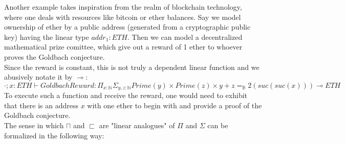 Another example takes inspiration from the realm of blockchain technology, where one deals with resources like bitcoin or ether balances. Say we model ownership of ether by a public address (generated from a cryptographic public key) having the linear type $addr_1 : ETH$. Then we can model a decentralized  mathematical prize comittee, which give out a reward of 1 ether to whoever proves the Goldbach conjecture.\\
Since the reward is constant, this is not truly a dependent linear function and we abusively notate it by $\multimap$:
\[
\cdot; x : ETH \vdash GoldbachReward: \Pi_{x : \mathbb{N}}\Sigma_{y, z : \mathbb{N}}Prime(y) \times Prime(z) \times y + z =_{\mathbb{B}} 2(suc(suc(x))) \multimap ETH
\]
To execute such a function and receive the reward, one would need to exhibit that there is an address $x$ with one ether to begin with and provide a proof of the Goldbach conjecture.\\
The sense in which $\sqcap$ and $\sqsubset$ are "linear analogues" of $\Pi$ and $\Sigma$ can be formalized in the following way:
